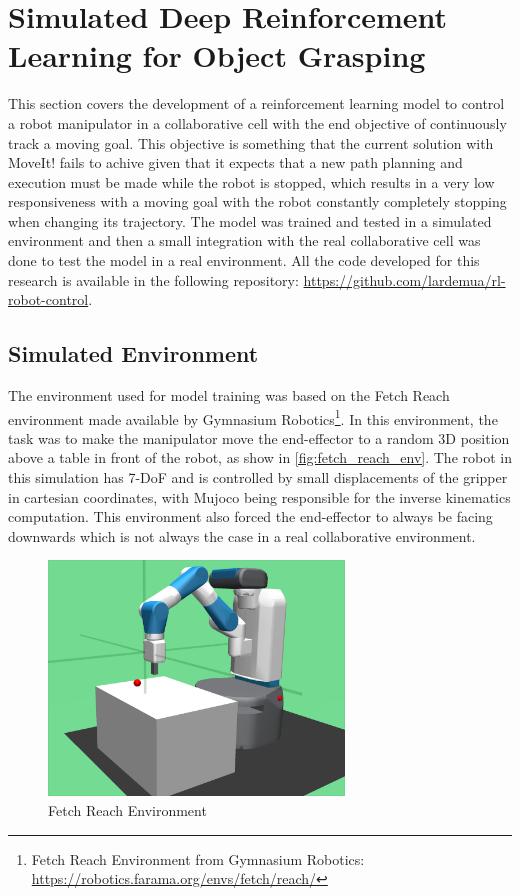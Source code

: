 \section{Simulated Deep Reinforcement Learning for Object Grasping}
\label{section:deep_reinforcement_learning}

This section covers the development of a reinforcement learning model to control a robot manipulator in a collaborative cell with the end objective of continuously track a moving goal. This objective is something that the current solution with MoveIt! fails to achive given that it expects that a new path planning and execution must be made while the robot is stopped, which results in a very low responsiveness with a moving goal with the robot constantly completely stopping when changing its trajectory. The model was trained and tested in a simulated environment and then a small integration with the real collaborative cell was done to test the model in a real environment. All the code developed for this research is available in the following repository: \url{https://github.com/lardemua/rl-robot-control}.

\subsection{Simulated Environment}

The environment used for model training was based on the Fetch Reach environment made available by Gymnasium Robotics\footnote{Fetch Reach Environment from Gymnasium Robotics: \url{https://robotics.farama.org/envs/fetch/reach/}}. In this environment, the task was to make the manipulator move the end-effector to a random 3D position above a table in front of the robot, as show in \autoref{fig:fetch_reach_env}. The robot in this simulation has 7-DoF and is controlled by small displacements of the gripper in cartesian coordinates, with Mujoco being responsible for the inverse kinematics computation. This environment also forced the end-effector to always be facing downwards which is not always the case in a real collaborative environment.

\begin{figure}[H]%
    \centerline{\includegraphics[width=0.7\textwidth]{figs/fetch_reach.png}}
    \caption[Fetch Reach Environment]{Fetch Reach Environment}
    \label{fig:fetch_reach_env}
\end{figure}

